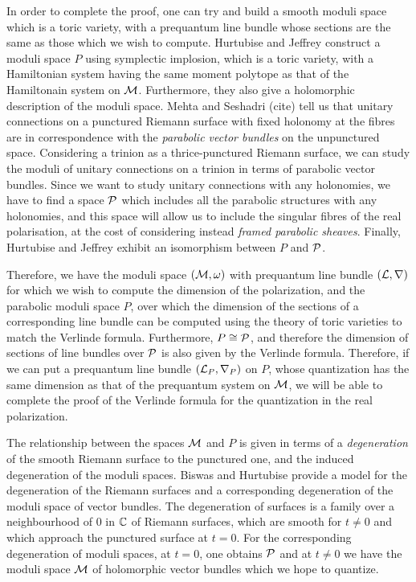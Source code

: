 	In order to complete the proof, one can try and build a smooth moduli space which is a toric variety, with a prequantum line bundle whose sections are the same as those which we wish to compute. Hurtubise and Jeffrey \cite{hurtubise_moduli_2005}\cite{hurtubise_representations_2000} construct a moduli space $P$ using symplectic implosion, which is a toric variety, with a Hamiltonian system having the same moment polytope as that of the Hamiltonain system on $\mathcal{M}$. Furthermore, they also give a holomorphic description of the moduli space. Mehta and Seshadri (cite) tell us that unitary connections on a punctured Riemann surface with fixed holonomy at the fibres are in correspondence with the \textit{parabolic vector bundles} on the unpunctured space. Considering a trinion as a thrice-punctured Riemann surface, we can study the moduli of unitary connections on a trinion in terms of parabolic vector bundles. Since we want to study unitary connections with any holonomies, we have to find a space $\mathcal{P}$ which includes all the parabolic structures with any holonomies, and this space will allow us to include the singular fibres of the real polarisation, at the cost of considering instead \emph{framed parabolic sheaves}. Finally, Hurtubise and Jeffrey exhibit an isomorphism between $P$ and $\mathcal{P}$.
	
	Therefore, we have the moduli space $(\mathcal{M},\omega)$ with prequantum line bundle $(\mathcal{L},\nabla)$ for which we wish to compute the dimension of the polarization, and the parabolic moduli space $P$, over which the dimension of the sections of a corresponding line bundle can be computed using the theory of toric varieties to match the Verlinde formula. Furthermore, $P \cong \mathcal{P}$, and therefore the dimension of sections of line bundles over $\mathcal{P}$ is also given by the Verlinde formula. Therefore, if we can put a prequantum line bundle $(\mathcal{L}_P, \nabla_P)$ on $P$, whose quantization has the same dimension as that of the prequantum system on $\mathcal{M}$, we will be able to complete the proof of the Verlinde formula for the quantization in the real polarization.
	
	The relationship between the spaces $\mathcal{M}$ and $P$ is given in terms of a \textit{degeneration} of the smooth Riemann surface to the punctured one, and the induced degeneration of the moduli spaces. Biswas and Hurtubise \cite{biswas_degenerations_2021} provide a model for the degeneration of the Riemann surfaces and a corresponding degeneration of the moduli space of vector bundles. The degeneration of surfaces is a family over a neighbourhood of $0$ in $\mathbb{C}$ of Riemann surfaces, which are smooth for $t\neq0$ and which approach the punctured surface at $t=0$. For the corresponding degeneration of moduli spaces, at $t=0$, one obtains $\mathcal{P}$ and at $t\neq 0$ we have the moduli space $\mathcal{M}$ of holomorphic vector bundles which we hope to quantize. 
	
